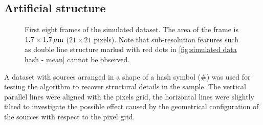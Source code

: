 \clearpage
\subsection{Artificial structure\label{sub:Simul hash}}
% 
\begin{figure}[!tb]	
	\newcommand{\widthfig}{.9\textwidth}
	\centering	
	
	
	

	\caption{First eight frames of the simulated dataset. The area of the frame is $1.7\times1.7\, \mathrm{\mu m}$ ($21\times21$ pixels). Note that sub-resolution features such as double line structure marked with red dots in \autoref{fig:simulated data hash - mean} cannot be observed.}
	\label{fig:simulated data hash}
\end{figure} 

A dataset with sources arranged in a shape of a hash symbol (\#) was used for testing the algorithm to recover structural details in the sample. The vertical parallel lines were aligned with the pixels grid, the horizontal lines were slightly tilted to investigate the possible effect caused by the geometrical configuration of the sources with respect to the pixel grid. 

